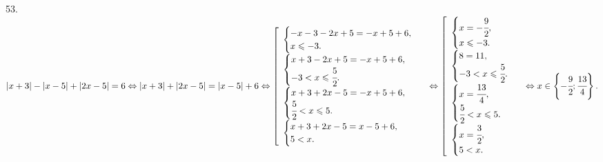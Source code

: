 53. $|x+3|-|x-5|+|2x-5|=6\Leftrightarrow |x+3|+|2x-5|=|x-5|+6\Leftrightarrow \left[\begin{array}{l}\begin{cases} -x-3-2x+5=-x+5+6,\\ x\leqslant-3.\end{cases}\\
\begin{cases} x+3-2x+5=-x+5+6,\\ -3<x\leqslant\cfrac{5}{2}.\end{cases}\\ \begin{cases} x+3+2x-5=-x+5+6,\\ \cfrac{5}{2}<x\leqslant5.\end{cases}\\
\begin{cases} x+3+2x-5=x-5+6,\\ 5< x.\end{cases}\end{array}\right.\Leftrightarrow \left[\begin{array}{l}\begin{cases} x=-\cfrac{9}{2},\\ x\leqslant-3.\end{cases}\\
\begin{cases} 8=11,\\ -3<x\leqslant\cfrac{5}{2}.\end{cases}\\ \begin{cases} x=\cfrac{13}{4},\\ \cfrac{5}{2}<x\leqslant5.\end{cases}\\
\begin{cases} x=\cfrac{3}{2},\\ 5< x.\end{cases}\end{array}\right.\Leftrightarrow x\in\left\{-\cfrac{9}{2};\cfrac{13}{4}\right\}.$\\
